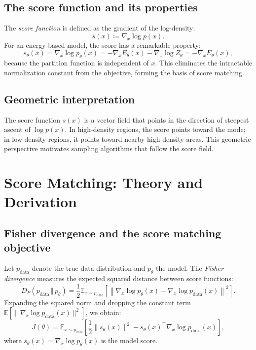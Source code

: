 \documentclass[11pt]{article}
\theoremstyle{definition}
\begin{document}
\subsection{The score function and its properties}
The \emph{score function} is defined as the gradient of the log-density:
\begin{equation}
s(x) \coloneqq \nabla_x \log p(x).
\end{equation}
For an energy-based model, the score has a remarkable property:
\begin{equation}
s_\theta(x) = \nabla_x \log p_\theta(x) = -\nabla_x E_\theta(x) - \nabla_x \log Z_\theta = -\nabla_x E_\theta(x),
\end{equation}
because the partition function is independent of $x$. 
This eliminates the intractable normalization constant from the objective, 
forming the basis of score matching.

\subsection{Geometric interpretation}
The score function $s(x)$ is a vector field that points in the direction of steepest ascent of $\log p(x)$. 
In high-density regions, the score points toward the mode; 
in low-density regions, it points toward nearby high-density areas. 
This geometric perspective motivates sampling algorithms that follow the score field.

\section{Score Matching: Theory and Derivation}

\subsection{Fisher divergence and the score matching objective}
Let $p_{\text{data}}$ denote the true data distribution and $p_\theta$ the model. 
The \emph{Fisher divergence} measures the expected squared distance between score functions:
\begin{equation}
\label{eq:fisher}
D_F(p_{\text{data}}\,\Vert\,p_\theta)
= \frac{1}{2}\mathbb{E}_{x \sim p_{\text{data}}} \left[ \left\| \nabla_x \log p_\theta(x) - \nabla_x \log p_{\text{data}}(x) \right\|^2 \right].
\end{equation}
Expanding the squared norm and dropping the constant term $\mathbb{E}[\|\nabla_x \log p_{\text{data}}(x)\|^2]$, we obtain:
\begin{equation}
\label{eq:fisher-expanded}
J(\theta) = \mathbb{E}_{x\sim p_{\text{data}}}\left[ \frac{1}{2} \| s_\theta(x) \|^2 - s_\theta(x)^\top \nabla_x \log p_{\text{data}}(x) \right],
\end{equation}
where $s_\theta(x) = \nabla_x \log p_\theta(x)$ is the model score.
\end{document}
